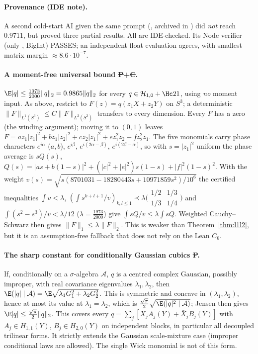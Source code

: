 \paragraph{Provenance (IDE note).} A second cold-start AI given the same prompt (, archived in
) did \emph{not} reach $0.9711$, but proved three partial results. All are IDE-checked. Its Node verifier
(only , BigInt) PASSES; an independent float evaluation agrees, with smallest matrix margin $\approx8.6\cdot10^{-7}$.

\paragraph{A moment-free universal bound \st{P}+\st{C}.} $\E|q|\le\frac{1973}{2000}\|q\|_2=0.9865\|q\|_2$ for every $q\in\mathcal H_{1,0}+\Hc21$, using \emph{no}
moment input. As above, restrict to $F(z)=q(z_1X+z_2Y)$ on $S^3$; a deterministic $\|F\|_{L^1(S^3)}\le C\|F\|_{L^2(S^3)}$ transfers to every dimension. Every $F$ has a zero
(the winding argument); moving it to $(0,1)$ leaves
$F=az_1|z_1|^2+bz_1|z_2|^2+cz_2|z_1|^2+ez_1^2\bar z_2+fz_2^2\bar z_1$. The five monomials carry phase characters $e^{i\alpha}$ ($a,b$), $e^{i\beta}$,
$e^{i(2\alpha-\beta)}$, $e^{i(2\beta-\alpha)}$, so with $s=|z_1|^2$ uniform the phase average is $sQ(s)$,
$Q(s)=|as+b(1-s)|^2+(|c|^2+|e|^2)s(1-s)+|f|^2(1-s)^2$. With the weight
$v(s)=\sqrt{s(8701031-18280443s+10971859s^2)/10^6}$ the certified inequalities $\int v<\lambda$,
$(\int s^{k+l+1}/v)_{k,l\le1}\prec\lambda\bigl(\begin{smallmatrix}1/2&1/3\\1/3&1/4\end{smallmatrix}\bigr)$ and $\int(s^2-s^3)/v<\lambda/12$ ($\lambda=\frac{1973}{2000}$) give
$\int sQ/v\le\lambda\int sQ$. Weighted Cauchy--Schwarz then gives $\|F\|_1\le\lambda\|F\|_2$. This is weaker than Theorem~\ref{thm:l1l2}, but it is an
assumption-free fallback that does not rely on the Lean $C_6$.

\paragraph{The sharp constant for conditionally Gaussian cubics \st{P}.} If, conditionally on a $\sigma$-algebra $\mathcal A$, $q$ is a centred complex Gaussian,
possibly improper, with real covariance eigenvalues $\lambda_1,\lambda_2$, then $\E(|q|\mid\mathcal A)=\E\sqrt{\lambda_1G_1^2+\lambda_2G_2^2}$. This is symmetric and
concave in $(\lambda_1,\lambda_2)$, hence at most its value at $\lambda_1=\lambda_2$, which is $\frac{\sqrt\pi}2\sqrt{\E(|q|^2\mid\mathcal A)}$; Jensen then gives
$\E|q|\le\frac{\sqrt\pi}2\|q\|_2$. This covers every $q=\sum_j[X_jA_j(Y)+\bar X_jB_j(Y)]$ with $A_j\in H_{1,1}(Y)$, $B_j\in H_{2,0}(Y)$ on independent blocks, in
particular all decoupled trilinear forms. It strictly extends the Gaussian scale-mixture case (improper conditional laws are allowed). The single Wick monomial is
not of this form.

